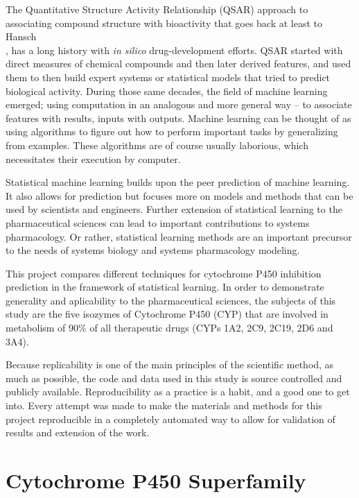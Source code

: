 The Quantitative Structure Activity Relationship (QSAR) approach to associating compound structure with bioactivity that goes back at least to Hansch\\ \cite{Hansch1964}, has a long history with \textit{in silico} drug-development efforts. QSAR started with direct measures of chemical compounds and then later derived features, and used them to then build expert systems or statistical models that tried to predict biological activity. During those same decades, the field of machine learning emerged; using computation in an analogous and more general way -- to associate features with results, inputs with outputs. Machine learning can be thought of as using algorithms to figure out how to perform important tasks by generalizing from examples. These algorithms are of course usually laborious, which necessitates their execution by computer.

Statistical machine learning builds upon the peer prediction of machine learning. It also allows for prediction but focuses more on models and methods that can be used by scientists and engineers. \cite{James2013} Further extension of statistical learning to the pharmaceutical sciences can lead to important contributions to systems pharmacology. Or rather, statistical learning methods are an important precursor to the needs of systems biology and systems pharmacology modeling.

This project compares different techniques for cytochrome P450 inhibition prediction in the framework of statistical learning. In order to demonstrate generality and aplicability to the pharmaceutical sciences, the subjects of this study are the five isozymes of Cytochrome P450 (CYP) that are involved in metabolism of 90\% of all therapeutic drugs (CYPs 1A2, 2C9, 2C19, 2D6 and 3A4). \cite{Veith2009}

Because replicability is one of the main principles of the scientific method, as much as possible, the code and data used in this study is source controlled and publicly available. Reproducibility as a practice is a habit, and a good one to get into. Every attempt was made to make the materials and methods for this project reproducible in a completely automated way to allow for validation of results and extension of the work.

\section{Cytochrome P450 Superfamily}

